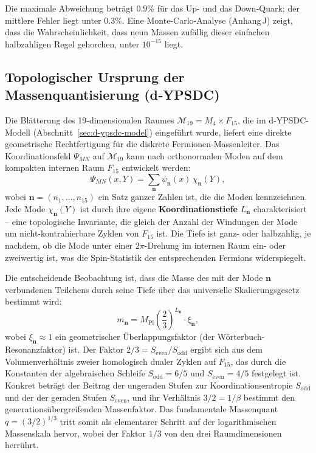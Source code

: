 \documentclass[12pt,a4paper]{article}
\begin{document}
	Die maximale Abweichung beträgt \(0.9\%\) für das Up- und das Down-Quark; der mittlere Fehler liegt unter \(0.3\%\).  Eine Monte-Carlo-Analyse (Anhang J) zeigt, dass die Wahrscheinlichkeit, dass neun Massen zufällig dieser einfachen halbzahligen Regel gehorchen, unter \(10^{-15}\) liegt.
	
	\subsection{Topologischer Ursprung der Massenquantisierung (d‑YPSDC)}
	\label{subsec:topo-mass}
	
	Die Blätterung des 19-dimensionalen Raumes \(\mathcal{M}_{19}=M_4\times F_{15}\), die im d‑YPSDC-Modell (Abschnitt~\ref{sec:d-ypsdc-model}) eingeführt wurde, liefert eine direkte geometrische Rechtfertigung für die diskrete Fermionen-Massenleiter. Das Koordinationsfeld \(\Psi_{MN}\) auf \(\mathcal{M}_{19}\) kann nach orthonormalen Moden auf dem kompakten internen Raum \(F_{15}\) entwickelt werden:
	\begin{equation}
		\Psi_{MN}(x,Y) = \sum_{\mathbf{n}} \psi_{\mathbf{n}}(x)\, \chi_{\mathbf{n}}(Y),
		\label{eq:mode-exp}
	\end{equation}
	wobei \(\mathbf{n}=(n_1,\dots,n_{15})\) ein Satz ganzer Zahlen ist, die die Moden kennzeichnen.
	Jede Mode \(\chi_{\mathbf{n}}(Y)\) ist durch ihre eigene \textbf{Koordinationstiefe} \(L_{\mathbf{n}}\) charakterisiert – eine topologische Invariante, die gleich der Anzahl der Windungen der Mode um nicht-kontrahierbare Zyklen von \(F_{15}\) ist. Die Tiefe ist ganz- oder halbzahlig, je nachdem, ob die Mode unter einer \(2\pi\)-Drehung im internen Raum ein- oder zweiwertig ist, was die Spin-Statistik des entsprechenden Fermions widerspiegelt.
	
	Die entscheidende Beobachtung ist, dass die Masse des mit der Mode \(\mathbf{n}\) verbundenen Teilchens durch seine Tiefe über das universelle Skalierungsgesetz bestimmt wird:
	\begin{equation}
		m_{\mathbf{n}} = M_{\mathrm{Pl}} \left( \frac{2}{3} \right)^{L_{\mathbf{n}}} \cdot \xi_{\mathbf{n}},
		\label{eq:mass-L}
	\end{equation}
	wobei \(\xi_{\mathbf{n}} \approx 1\) ein geometrischer Überlappungsfaktor (der Wörterbuch-Resonanzfaktor) ist. Der Faktor \(2/3 = S_{\mathrm{even}}/S_{\mathrm{odd}}\) ergibt sich aus dem Volumenverhältnis zweier homologisch dualer Zyklen auf \(F_{15}\), das durch die Konstanten der algebraischen Schleife \(S_{\mathrm{odd}}=6/5\) und \(S_{\mathrm{even}}=4/5\) festgelegt ist. Konkret beträgt der Beitrag der ungeraden Stufen zur Koordinationsentropie \(S_{\mathrm{odd}}\) und der der geraden Stufen \(S_{\mathrm{even}}\), und ihr Verhältnis \(3/2 = 1/\beta\) bestimmt den generationsübergreifenden Massenfaktor. Das fundamentale Massenquant \(q = (3/2)^{1/3}\) tritt somit als elementarer Schritt auf der logarithmischen Massenskala hervor, wobei der Faktor \(1/3\) von den drei Raumdimensionen herrührt.
	
\end{document}
